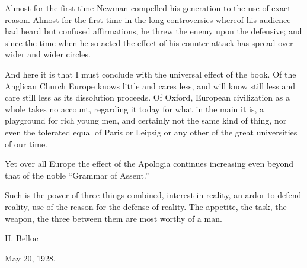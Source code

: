 Almost for the first time Newman compelled his
generation to the use of exact reason. Almost for the first time in the
long controversies whereof his audience had heard but confused
affirmations, he threw the enemy upon the defensive; and since the time
when he so acted the effect of his counter attack has spread over wider
and wider circles.

And here it is that I must conclude with the
universal effect of the book. Of the Anglican Church Europe knows little
and cares less, and will know still less and care still less as its
dissolution proceeds. Of Oxford, European civilization as a whole takes
no account, regarding it today for what in the main it is, a playground
for rich young men, and certainly not the same kind of thing, nor even
the tolerated equal of Paris or Leipsig or any other of the great
universities of our time.

Yet over all Europe the effect of the Apologia
continues increasing even beyond that of the noble ``Grammar of Assent.''

Such is the power of three things combined,
interest in reality, an ardor to defend reality, use of the reason for
the defense of reality. The appetite, the task, the weapon, the
three between them are most worthy of a man.

H. Belloc

May 20, 1928.

